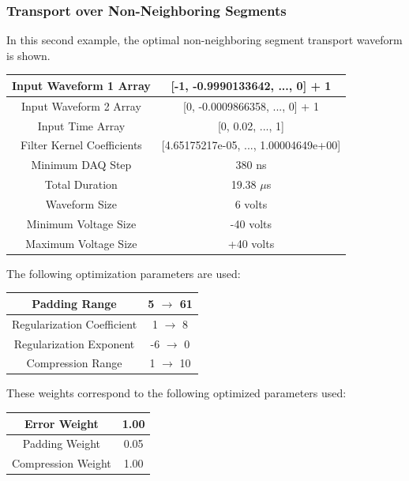 \documentclass[11pt, a4paper]{article}
\theoremstyle{definition}
\numberwithin{equation}{section}
\begin{document}
\subsubsection{Transport over Non-Neighboring Segments}

In this second example, the optimal non-neighboring segment transport waveform is shown.

\begin{center}
\begin{tabular}{ | c | c | } 
  \hline
   Input Waveform 1 Array & [-1, -0.9990133642, ..., 0] + 1 \\ 
  \hline
  Input Waveform 2 Array & [0, -0.0009866358, ..., 0] + 1 \\ 
  \hline
  Input Time Array & [0, 0.02, ..., 1] \\ 
  \hline
  Filter Kernel Coefficients & [4.65175217e-05, ..., 1.00004649e+00] \\ 
  \hline
  Minimum DAQ Step & 380 ns \\ 
  \hline
  Total Duration & 19.38 $\mu$s \\ 
  \hline
  Waveform Size & 6 volts \\ 
  \hline
  Minimum Voltage Size & -40 volts \\ 
  \hline
  Maximum Voltage Size & +40 volts \\ 
  \hline
\end{tabular}
\end{center}

The following optimization parameters are used:

\begin{center}
\begin{tabular}{ | c | c | } 
  \hline
   Padding Range & 5 $\rightarrow$ 61 \\ 
  \hline
  Regularization Coefficient & 1 $\rightarrow$ 8 \\ 
  \hline
  Regularization Exponent & -6 $\rightarrow$ 0 \\ 
  \hline
  Compression Range & 1 $\rightarrow$ 10 \\ 
  \hline
\end{tabular}
\end{center}

These weights correspond to the following optimized parameters used:

\begin{center}
\begin{tabular}{ | c | c | } 
  \hline
   Error Weight & 1.00 \\ 
  \hline
  Padding Weight & 0.05 \\ 
  \hline
  Compression Weight & 1.00 \\ 
  \hline
\end{tabular}
\end{center}
\end{document}
